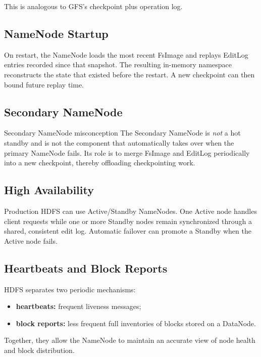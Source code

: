 \documentclass[11pt,a4paper,oneside]{book}
\begin{document}
This is analogous to GFS's checkpoint plus operation log.

\subsection{NameNode Startup}

On restart, the NameNode loads the most recent FsImage and replays EditLog entries recorded since that snapshot. The resulting in-memory namespace reconstructs the state that existed before the restart. A new checkpoint can then bound future replay time.

\subsection{Secondary NameNode}

\begin{remarkbox}{Secondary NameNode misconception}
The Secondary NameNode is \emph{not} a hot standby and is not the component that automatically takes over when the primary NameNode fails. Its role is to merge FsImage and EditLog periodically into a new checkpoint, thereby offloading checkpointing work.
\end{remarkbox}

\subsection{High Availability}

Production HDFS can use Active/Standby NameNodes. One Active node handles client requests while one or more Standby nodes remain synchronized through a shared, consistent edit log. Automatic failover can promote a Standby when the Active node fails.

\subsection{Heartbeats and Block Reports}

HDFS separates two periodic mechanisms:

\begin{itemize}
    \item \textbf{heartbeats:} frequent liveness messages;
    \item \textbf{block reports:} less frequent full inventories of blocks stored on a DataNode.
\end{itemize}

Together, they allow the NameNode to maintain an accurate view of node health and block distribution.
\end{document}
